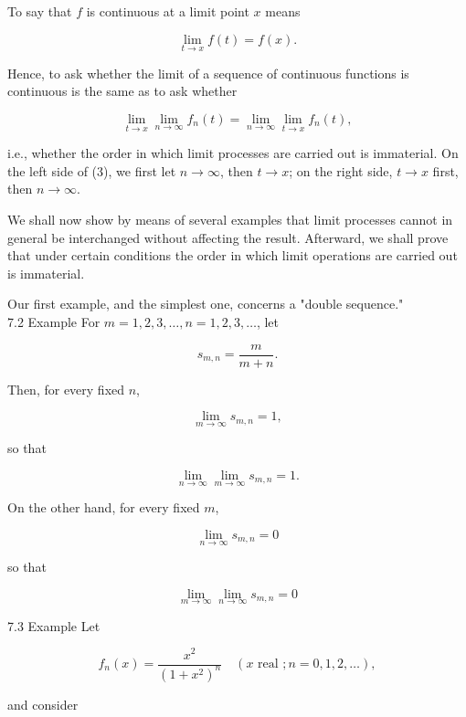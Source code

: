 \documentclass[10pt]{article}
\begin{document}
To say that $f$ is continuous at a limit point $x$ means

$$
\lim _{t \rightarrow x} f(t)=f(x) .
$$

Hence, to ask whether the limit of a sequence of continuous functions is continuous is the same as to ask whether


\begin{equation*}
\lim _{t \rightarrow x} \lim _{n \rightarrow \infty} f_{n}(t)=\lim _{n \rightarrow \infty} \lim _{t \rightarrow x} f_{n}(t), \tag{3}
\end{equation*}


i.e., whether the order in which limit processes are carried out is immaterial. On the left side of (3), we first let $n \rightarrow \infty$, then $t \rightarrow x$; on the right side, $t \rightarrow x$ first, then $n \rightarrow \infty$.

We shall now show by means of several examples that limit processes cannot in general be interchanged without affecting the result. Afterward, we shall prove that under certain conditions the order in which limit operations are carried out is immaterial.

Our first example, and the simplest one, concerns a "double sequence."\\
7.2 Example For $m=1,2,3, \ldots, n=1,2,3, \ldots$, let

$$
s_{m, n}=\frac{m}{m+n} .
$$

Then, for every fixed $n$,

$$
\lim _{m \rightarrow \infty} s_{m, n}=1,
$$

so that


\begin{equation*}
\lim _{n \rightarrow \infty} \lim _{m \rightarrow \infty} s_{m, n}=1 . \tag{4}
\end{equation*}


On the other hand, for every fixed $m$,

$$
\lim _{n \rightarrow \infty} s_{m, n}=0
$$

so that


\begin{equation*}
\lim _{m \rightarrow \infty} \lim _{n \rightarrow \infty} s_{m, n}=0 \tag{5}
\end{equation*}


7.3 Example Let

$$
f_{n}(x)=\frac{x^{2}}{\left(1+x^{2}\right)^{n}} \quad(x \text { real } ; n=0,1,2, \ldots),
$$

and consider
\end{document}
